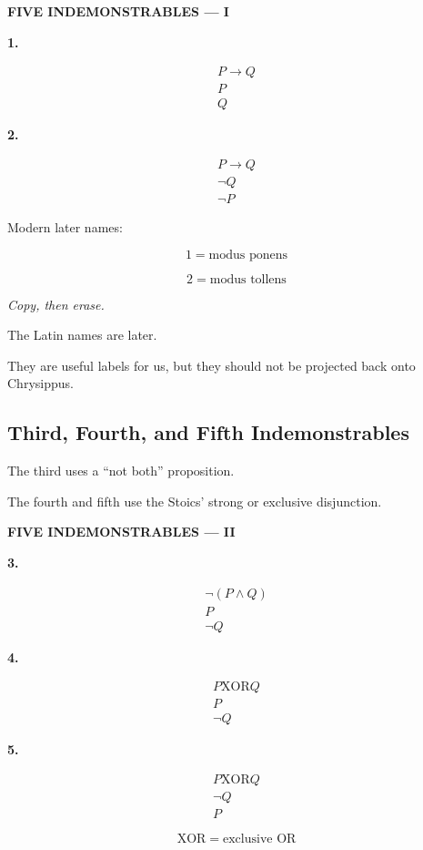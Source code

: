 \documentclass[11pt]{article}
\newcommand{\xor}{\mathbin{\mathrm{XOR}}}
\begin{document}
\begin{whiteboard}
\textbf{FIVE INDEMONSTRABLES --- I}

\textbf{1.}

\[
\begin{array}{c}
P\rightarrow Q\\
P\\
\hline
Q
\end{array}
\]

\textbf{2.}

\[
\begin{array}{c}
P\rightarrow Q\\
\neg Q\\
\hline
\neg P
\end{array}
\]

Modern later names:

\[
1=\text{modus ponens}
\]

\[
2=\text{modus tollens}
\]

\textit{Copy, then erase.}
\end{whiteboard}

The Latin names are later.

They are useful labels for us, but they should not be projected
back onto Chrysippus.

\subsection{Third, Fourth, and Fifth Indemonstrables}

The third uses a ``not both'' proposition.

The fourth and fifth use the Stoics' strong or exclusive
disjunction.

\begin{whiteboard}
\textbf{FIVE INDEMONSTRABLES --- II}

\textbf{3.}

\[
\begin{array}{c}
\neg(P\land Q)\\
P\\
\hline
\neg Q
\end{array}
\]

\textbf{4.}

\[
\begin{array}{c}
P\xor Q\\
P\\
\hline
\neg Q
\end{array}
\]

\textbf{5.}

\[
\begin{array}{c}
P\xor Q\\
\neg Q\\
\hline
P
\end{array}
\]

\[
\xor
=
\text{exclusive OR}
\]
\end{whiteboard}
\end{document}
